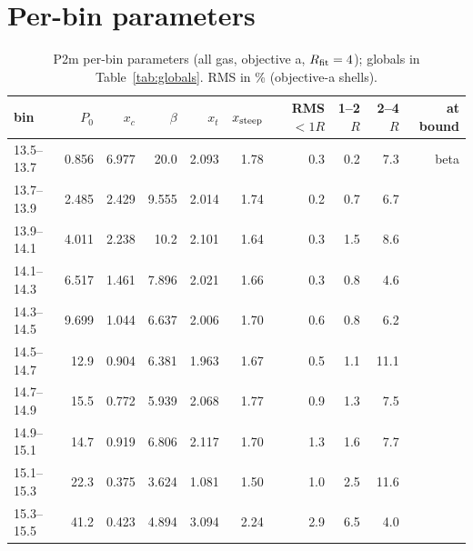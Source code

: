 \documentclass[10pt,a4paper]{article}
\begin{document}
\section{Per-bin parameters}
\begin{table}[H]
\centering
\footnotesize
\caption{P2m per-bin parameters (all gas, objective a, $R_{\rm fit}=4$); globals in Table~\ref{tab:globals}. RMS in \% (objective-a shells).}
\label{tab:P2mbins}
\begin{tabular}{lrrrrrrrrr}
\toprule
bin & $P_0$ & $x_c$ & $\beta$ & $x_t$ & $x_{\rm steep}$ & RMS $<1R$ & 1--2$R$ & 2--4$R$ & at bound \\
\midrule
13.5--13.7 & 0.856 & 6.977 & 20.0 & 2.093 & 1.78 & 0.3 & 0.2 & 7.3 & beta \\
13.7--13.9 & 2.485 & 2.429 & 9.555 & 2.014 & 1.74 & 0.2 & 0.7 & 6.7 &  \\
13.9--14.1 & 4.011 & 2.238 & 10.2 & 2.101 & 1.64 & 0.3 & 1.5 & 8.6 &  \\
14.1--14.3 & 6.517 & 1.461 & 7.896 & 2.021 & 1.66 & 0.3 & 0.8 & 4.6 &  \\
14.3--14.5 & 9.699 & 1.044 & 6.637 & 2.006 & 1.70 & 0.6 & 0.8 & 6.2 &  \\
14.5--14.7 & 12.9 & 0.904 & 6.381 & 1.963 & 1.67 & 0.5 & 1.1 & 11.1 &  \\
14.7--14.9 & 15.5 & 0.772 & 5.939 & 2.068 & 1.77 & 0.9 & 1.3 & 7.5 &  \\
14.9--15.1 & 14.7 & 0.919 & 6.806 & 2.117 & 1.70 & 1.3 & 1.6 & 7.7 &  \\
15.1--15.3 & 22.3 & 0.375 & 3.624 & 1.081 & 1.50 & 1.0 & 2.5 & 11.6 &  \\
15.3--15.5 & 41.2 & 0.423 & 4.894 & 3.094 & 2.24 & 2.9 & 6.5 & 4.0 &  \\
\bottomrule
\end{tabular}
\end{table}
\end{document}
